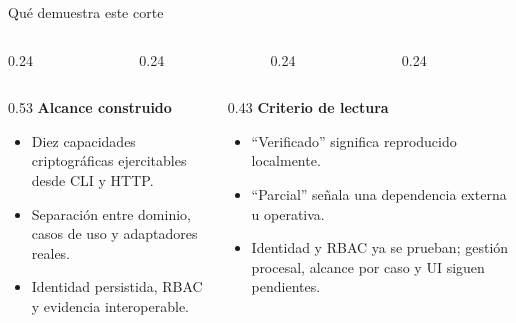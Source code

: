 \documentclass[aspectratio=169,11pt]{beamer}
\begin{document}
\begin{frame}{Qué demuestra este corte}
  \begin{columns}[T,onlytextwidth]
    \begin{column}{0.24\textwidth}\end{column}
    \begin{column}{0.24\textwidth}\end{column}
    \begin{column}{0.24\textwidth}\end{column}
    \begin{column}{0.24\textwidth}\end{column}
  \end{columns}

  \vspace{0.18cm}
  \begin{columns}[T,onlytextwidth]
    \begin{column}{0.53\textwidth}
      \footnotesize
      \textbf{Alcance construido}
      \begin{itemize}
        \item Diez capacidades criptográficas ejercitables desde CLI y HTTP.
        \item Separación entre dominio, casos de uso y adaptadores reales.
        \item Identidad persistida, RBAC y evidencia interoperable.
      \end{itemize}
    \end{column}
    \begin{column}{0.43\textwidth}
      \footnotesize
      \textbf{Criterio de lectura}
      \begin{itemize}
        \item ``Verificado'' significa reproducido localmente.
        \item ``Parcial'' señala una dependencia externa u operativa.
        \item Identidad y RBAC ya se prueban; gestión procesal, alcance por caso y UI siguen pendientes.
      \end{itemize}
    \end{column}
  \end{columns}
\end{frame}
\end{document}
